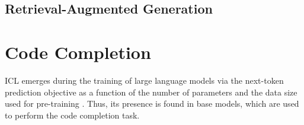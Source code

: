\subsection{Retrieval-Augmented Generation}


\section{Code Completion}  %

ICL emerges during the training of large language models via the next-token prediction objective as a function of the number of parameters and the data size used for pre-training \parencite{hahn2023}. Thus, its presence is found in base models, which are used to perform the code completion task.
